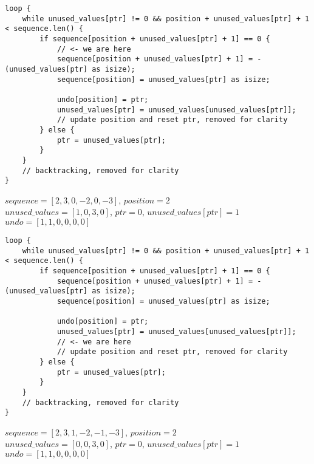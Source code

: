 \begin{frame}[fragile]
    \begin{verbatim}
loop {
    while unused_values[ptr] != 0 && position + unused_values[ptr] + 1 < sequence.len() {
        if sequence[position + unused_values[ptr] + 1] == 0 {
            // <- we are here
            sequence[position + unused_values[ptr] + 1] = -(unused_values[ptr] as isize);
            sequence[position] = unused_values[ptr] as isize;

            undo[position] = ptr;
            unused_values[ptr] = unused_values[unused_values[ptr]];
            // update position and reset ptr, removed for clarity
        } else {
            ptr = unused_values[ptr];
        }
    }
    // backtracking, removed for clarity
}
    \end{verbatim}
    $sequence = [2, 3, 0, -2, 0, -3]$, $position = 2$\\
    $unused\_values = [1, 0, 3, 0]$, $ptr = 0$, $unused\_values[ptr] = 1$\\
    $undo = [1, 1, 0, 0, 0, 0]$
\end{frame}
\begin{frame}[fragile]
    \begin{verbatim}
loop {
    while unused_values[ptr] != 0 && position + unused_values[ptr] + 1 < sequence.len() {
        if sequence[position + unused_values[ptr] + 1] == 0 {
            sequence[position + unused_values[ptr] + 1] = -(unused_values[ptr] as isize);
            sequence[position] = unused_values[ptr] as isize;
            
            undo[position] = ptr;
            unused_values[ptr] = unused_values[unused_values[ptr]];
            // <- we are here
            // update position and reset ptr, removed for clarity
        } else {
            ptr = unused_values[ptr];
        }
    }
    // backtracking, removed for clarity
}
    \end{verbatim}
    $sequence = [2, 3, 1, -2, -1, -3]$, $position = 2$\\
    $unused\_values = [0, 0, 3, 0]$, $ptr = 0$, $unused\_values[ptr] = 1$\\
    $undo = [1, 1, 0, 0, 0, 0]$
\end{frame}
